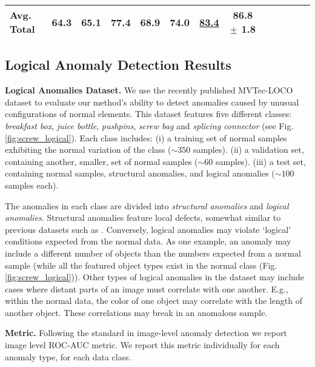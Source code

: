 \documentclass{article}
\begin{document}
\begin{table*}[t]
\begin{tabular}{lcccccccccccc}
Avg. Total		&	64.3	&	65.1	&	77.4	&	68.9	&	74.0 & \underline{83.4}	&	\textbf{86.8} $\pm$ \textbf{1.8}	\\
 
\bottomrule
\end{tabular}
\label{tab:loco_anomalies}
\end{table*}




\subsection{Logical Anomaly Detection Results}

\textbf{Logical Anomalies Dataset.} We use the recently published MVTec-LOCO dataset \cite{bergmann2022beyond} to evaluate our method's ability to detect anomalies caused by unusual configurations of normal elements. This dataset features five different classes: \textit{breakfast box}, \textit{juice bottle}, \textit{pushpins}, \textit{screw bag} and \textit{splicing connector} (see Fig.\ref{fig:screw_logical}).  Each class includes: (i) a training set of normal samples exhibiting the normal variation of the class ($\sim 350$ samples). (ii) a validation set, containing another, smaller, set of normal samples ($\sim 60$ samples). (iii) a test set, containing normal samples, structural anomalies, and logical anomalies ($\sim 100$ samples each). 

The anomalies in each class are divided into \textit{structural anomalies} and \textit{logical anomalies}. Structural anomalies feature local defects, somewhat similar to previous datasets such as \cite{bergmann2019mvtec}. Conversely, logical anomalies may violate `logical' conditions expected from the normal data. As one example, an anomaly may include a different number of objects than the numbers expected from a normal sample (while all the featured object types exist in the normal class (Fig.\ref{fig:screw_logical})). Other types of logical anomalies in the dataset may include cases where distant parts of an image must correlate with one another. E.g., within the normal data, the color of one object may correlate with the length of another object. These correlations may break in an anomalous sample. 

\textbf{Metric.} Following the standard in image-level anomaly detection we report image level ROC-AUC metric. We report this metric individually for each anomaly type, for each data class.
\end{document}
